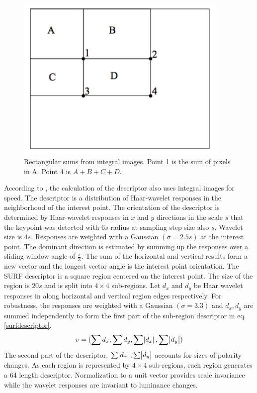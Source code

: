 \documentclass[english,12pt,a4paper,pdftex,elec,utf8, table]{aaltothesis}
\begin{document}
\begin{figure}[htb]
\begin{center}
\includegraphics[height=8cm]{figures/integralimage}
\end{center}
\caption{Rectangular sums from integral images. Point 1 is the sum of pixels in A. Point 4 is $A + B + C + D$.\cite{Viola2001}}
\label{integralimagefig}
\end{figure}
According to \cite{Bay2006}, the calculation of the descriptor also uses integral images for speed. The descriptor is a distribution of Haar-wavelet responses in the neighborhood of the interest point. The orientation of the descriptor is determined by Haar-wavelet responses in $x$ and $y$ directions in the scale $s$ that the keypoint was detected with $6s$ radius at sampling step size also $s$. Wavelet size is $4s$. Responses are weighted with a Gaussian $(\sigma = 2.5s)$ at the interest point. The dominant direction is estimated by summing up the responses over a sliding window angle of $\frac{\pi}{3}$. The sum of the horizontal and vertical results form a new vector and the longest vector angle is the interest point orientation. The SURF descriptor is a square region centered on the interest point. The size of the region is $20s$ and is split into $4 \times 4$ sub-regions. Let $d_x$ and $d_y$ be Haar wavelet responses in along horizontal and vertical region edges respectively. For robustness, the responses are weighted with a Gaussian $(\sigma = 3.3)$ and $d_x, d_y$ are summed independently to form the first part of the sub-region descriptor in eq. \ref{surfdescriptor}.
\begin{equation}
  \label{surfdescriptor}
v = (\sum d_x, \sum d_y, \sum \abs{d_x}, \sum \abs{d_y})
  \end{equation}
The second part of the descriptor, $\sum \abs{d_x}, \sum \abs{d_y}$ accounts for sizes of polarity changes. As each region is represented by $4 \times 4$ sub-regions, each region generates a 64 length descriptor. Normalization to a unit vector provides scale invariance while the wavelet responses are invariant to luminance changes.
\end{document}

